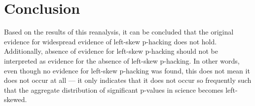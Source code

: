\section*{Conclusion}
Based on the results of this reanalysis, it can be concluded that the original evidence for widespread evidence of left-skew p-hacking \cite{Head_2015} does not hold. Additionally, absence of evidence for left-skew p-hacking should not be interpreted as evidence for the absence of left-skew p-hacking. In other words, even though no evidence for left-skew p-hacking was found, this does not mean it does not occur at all --- it only indicates that it does not occur so frequently such that the aggregate distribution of significant p-values in science becomes left-skewed. 
  
  
  
  
  